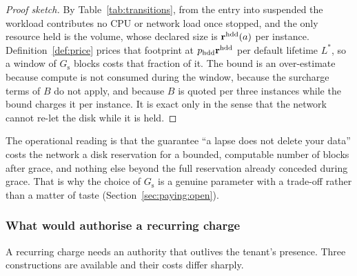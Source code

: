 \begin{proof}[Proof sketch]
By Table~\ref{tab:transitions}, from the entry into \textsf{suspended} the workload contributes no CPU or
network load once stopped, and the only resource held is the volume, whose declared size is
$\mathbf{r}^{\mathrm{hdd}}(a)$ per instance. Definition~\ref{def:price} prices that footprint at
$p_{\mathrm{hdd}}\mathbf{r}^{\mathrm{hdd}}$ per default lifetime $L^{\ast}$, so a window of
$G_{\mathrm{s}}$ blocks costs that fraction of it. The bound is an over-estimate
because compute is not consumed during the window, because the surcharge terms of $B$ do not
apply, and because $B$ is quoted per three instances while the bound charges it per instance. It is
exact only in the sense that the network cannot re-let the disk while it is held.
\end{proof}

The operational reading is that the guarantee ``a lapse does not delete your data'' costs the network
a disk reservation for a bounded, computable number of blocks after grace, and nothing else beyond the
full reservation already conceded during grace. That is why the
choice of $G_{\mathrm{s}}$ is a genuine parameter with a trade-off rather than a matter of taste
(Section~\ref{sec:paying:open}).

\subsubsection{What would authorise a recurring charge}

A recurring charge needs an authority that outlives the tenant's presence. Three constructions are
available and their costs differ sharply.

